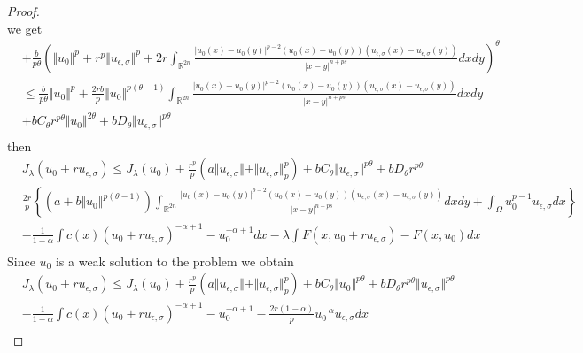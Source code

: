 \documentclass[10pt,twoside,reqno,centertags,draft]{amsart}
\begin{document}
\begin{proof}
\begin{equation*}
\end{equation*}
we get
\footnotesize
\begin{equation*}
\begin{aligned}
&+\frac{b}{p\theta}\left( \Vert u_0\Vert^{p} +r^{p}\Vert u_{\epsilon,\sigma}\Vert^{p} +2r\int_{\mathbb{R}^{2n}}\frac{\vert u_0(x) -u_0(y)\vert^{p -2}(u_0(x) -u_0(y))(u_{\epsilon,\sigma}(x) -u_{\epsilon,\sigma}(y))}{\vert x -y\vert^{n +ps}}dxdy \right)^{\theta}\\
&\leq \frac{b}{p\theta}\Vert u_0\Vert^{p} +\frac{2rb}{p} \Vert u_0\Vert^{p(\theta -1)}\int_{\mathbb{R}^{2n}}\frac{\vert u_0(x) -u_0(y)\vert^{p -2}(u_0(x) -u_0(y))(u_{\epsilon,\sigma}(x) -u_{\epsilon,\sigma}(y))}{\vert x -y\vert^{n +ps}}dxdy\\
& +bC_{\theta} r^{p\theta}\Vert u_{0}\Vert^{2\theta} +bD_{\theta} \Vert u_{\epsilon,\sigma}\Vert^{p\theta}\\
\end{aligned}
\end{equation*}
then 
{\tiny
\begin{equation*}
\begin{aligned}
&J_{\lambda}(u_0 +ru_{\epsilon,\sigma}) \leq  J_{\lambda}(u_0)+\frac{r^{p}}{p}\left( a\Vert u_{\epsilon,\sigma}\Vert +\Vert u_{\epsilon,\sigma}\Vert^{p}_{p}\right) +bC_{\theta}\Vert u_{\epsilon,\sigma}\Vert^{p\theta} +b D_{\theta} r^{p\theta}\\
& \frac{2r}{p}\left\{\left(a +b\Vert u_0\Vert^{p(\theta -1)}\right)\int_{\mathbb{R}^{2n}}\frac{\vert u_0(x) -u_0(y)\vert^{p -2}(u_0(x) -u_0(y))(u_{\epsilon,\sigma}(x) -u_{\epsilon,\sigma}(y))}{\vert x -y\vert^{n +ps}}dxdy +\int_{\Omega}u_0^{p-1} u_{\epsilon,\sigma}dx\right\}\\
& -\frac{1}{1 -\alpha}\int c(x)(u_0 +ru_{\epsilon,\sigma})^{-\alpha+1} -u_0^{-\alpha +1}dx -\lambda\int F(x,u_0 +ru_{\epsilon,\sigma}) -F(x,u_0)dx\\
\end{aligned}
\end{equation*}
}
Since $ u_0$ is a weak solution to the problem we obtain
\begin{equation}\label{eee20}
\begin{aligned}
& J_{\lambda}(u_0 +ru_{\epsilon,\sigma})\leq  J_{\lambda}(u_0)+\frac{r^{p}}{p}\left( a\Vert u_{\epsilon,\sigma}\Vert +\Vert u_{\epsilon,\sigma}\Vert^{p}_{p}\right) +bC_{\theta}\Vert u_{0}\Vert^{p\theta} +b D_{\theta} r^{p\theta}\Vert u_{\epsilon,\sigma}\Vert^{p\theta}\\
& -\frac{1}{1 -\alpha}\int c(x)(u_0 +ru_{\epsilon,\sigma})^{-\alpha+1} -u_0^{-\alpha +1} -\frac{2r(1 -\alpha)}{p}u_0^{-\alpha}u_{\epsilon,\sigma}dx\\

\end{aligned}
\end{equation}
\end{proof}
\end{document}
